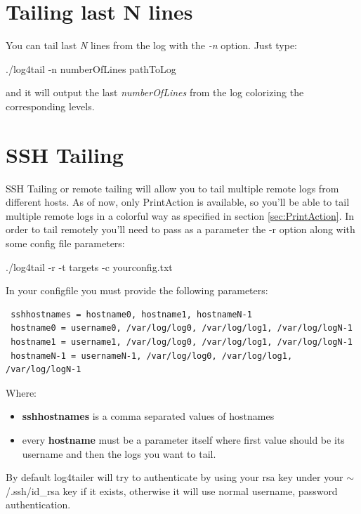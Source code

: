 \section{Tailing last N lines}
You can tail last \emph{N} lines from the log with the \emph{-n} option. Just type:
\begin{cmd}
 ./log4tail -n numberOfLines pathToLog
\end{cmd}
and it will output the last \emph{numberOfLines} from the log colorizing the
corresponding levels.

  

\section{SSH Tailing}
SSH Tailing or remote tailing will allow you to tail multiple remote logs from
different hosts. As of now, only PrintAction is available, so you'll be able to
tail multiple remote logs in a colorful way as specified in section
\ref{sec:PrintAction}. In order to tail remotely you'll need to pass as a
parameter the -r option along with some config file parameters:

\begin{cmd}
 ./log4tail -r -t targets -c yourconfig.txt
\end{cmd}
In your configfile you must provide the following parameters:

\begin{config}
\begin{verbatim}
 sshhostnames = hostname0, hostname1, hostnameN-1
 hostname0 = username0, /var/log/log0, /var/log/log1, /var/log/logN-1
 hostname1 = username1, /var/log/log0, /var/log/log1, /var/log/logN-1
 hostnameN-1 = usernameN-1, /var/log/log0, /var/log/log1, /var/log/logN-1
\end{verbatim}
\end{config}

\noindent
Where:
\begin{itemize}
\item \textbf{sshhostnames} is a comma separated values of hostnames
\item every \textbf{hostname} must be a parameter itself where first 
value should be its username and then the logs you want to tail.
\end{itemize}

By default log4tailer will try to authenticate by using your rsa key under your
$\sim$/.ssh/id\_rsa key if it exists, otherwise it will use normal username, password
authentication. 

